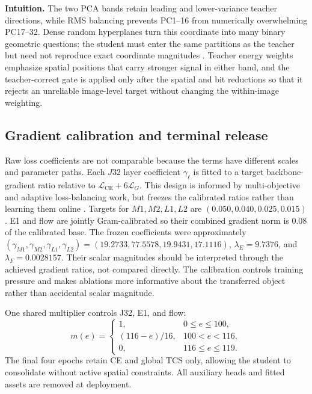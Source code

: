 \textbf{Intuition.} The two PCA bands retain leading and lower-variance
teacher directions, while RMS balancing prevents PC1--16 from numerically
overwhelming PC17--32. Dense random hyperplanes turn this coordinate into many
binary geometric questions: the student must enter the same partitions as the
teacher but need not reproduce exact coordinate magnitudes
\cite{charikar2002simhash}. Teacher energy weights emphasize spatial positions
that carry stronger signal in either band, and the teacher-correct gate is
applied only after the spatial and bit reductions so that it rejects an
unreliable image-level target without changing the within-image weighting.

\subsection{Gradient calibration and terminal release}

Raw loss coefficients are not comparable because the terms have different
scales and parameter paths. Each $J32$ layer coefficient $\gamma_\ell$ is
fitted to a target backbone-gradient ratio relative to
$\mathcal{L}_{\mathrm{CE}}+6\mathcal{L}_G$. This design is informed by
multi-objective and adaptive loss-balancing work, but freezes the calibrated
ratios rather than learning them online
\cite{chen2018gradnorm,kendall2018multitask,sener2018multiobjective,
yu2020pcgrad}. Targets for
$M1,M2,L1,L2$ are $(0.050,0.040,0.025,0.015)$. E1 and flow are jointly
Gram-calibrated so their combined gradient norm is $0.08$ of the calibrated
base. The frozen coefficients were approximately
$(\gamma_{M1},\gamma_{M2},\gamma_{L1},\gamma_{L2})
=(19.2733,77.5578,19.9431,17.1116)$,
$\lambda_E=9.7376$, and $\lambda_F=0.0028157$. Their scalar magnitudes should
be interpreted through the achieved gradient ratios, not compared directly.
The calibration controls training pressure and makes ablations more informative
about the transferred object rather than accidental scalar magnitude.

One shared multiplier controls J32, E1, and flow:
\begin{equation}
m(e)=
\begin{cases}
1, & 0\leq e\leq100,\\
(116-e)/16, & 100<e<116,\\
0, & 116\leq e\leq119.
\end{cases}
\label{eq:j1-schedule}
\end{equation}
The final four epochs retain CE and global TCS only, allowing the student to
consolidate without active spatial constraints. All auxiliary heads and fitted
assets are removed at deployment.

